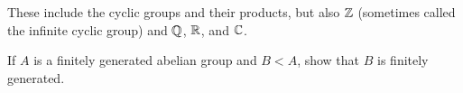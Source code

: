 These include the cyclic groups and their products, but also $\mathbb{Z}$ (sometimes called the infinite cyclic group) and $\mathbb{Q}$, $\mathbb{R}$, and $\mathbb{C}$.

\begin{ex}
If $A$ is a finitely generated abelian group and $B < A$, show that $B$ is finitely generated.
\end{ex}
